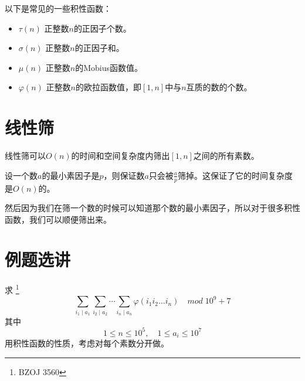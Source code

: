 \documentclass{beamer}
\begin{document}
		\begin{frame}
			以下是常见的一些积性函数：
			\begin{itemize}
				\item $\tau(n)$  正整数$n$的正因子个数。
				\item $\sigma(n)$  正整数$n$的正因子和。
				\item $\mu(n)$  正整数$n$的Mobius函数值。
				\item $\varphi(n)$  正整数$n$的欧拉函数值，即$[1,n]$中与$n$互质的数的个数。
			\end{itemize}
			
		\end{frame}
	
	\section{线性筛}
		\begin{frame}
			线性筛可以$O(n)$的时间和空间复杂度内筛出$ [1,n] $之间的所有素数。
			
			设一个数$a$的最小素因子是$p$，则保证数$a$只会被$\frac{a}{p}$筛掉。这保证了它的时间复杂度是$O(n)$的。
			
			然后因为我们在筛一个数的时候可以知道那个数的最小素因子，所以对于很多积性函数，我们可以顺便筛出来。
		\end{frame}
		
	\section{例题选讲}
		\begin{frame}
			求			\footnote{BZOJ 3560}
			$$
				\sum_{i_1 \mid a_1}\sum_{i_2 \mid a_2}\cdots\sum_{i_n \mid a_n }  \varphi(i_1i_2\dots i_n) \quad mod \; 10^9 + 7
			$$
			其中
			$$
				1 \leq n \leq 10^5, \quad 1 \leq a_i \leq 10^7
			$$
			\pause
			用积性函数的性质，考虑对每个素数分开做。
		\end{frame}
		
\end{document}
